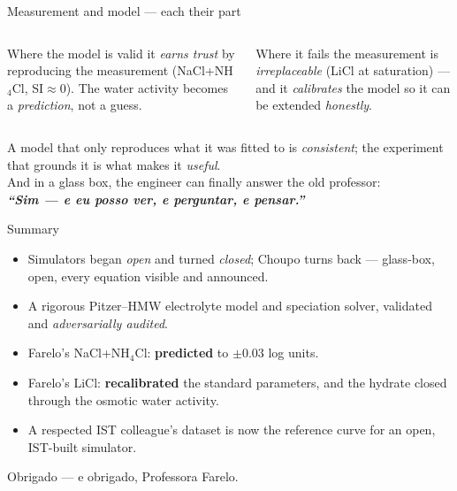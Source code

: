 \documentclass[aspectratio=169,11pt]{beamer}
\begin{document}
\begin{frame}{Measurement and model --- each their part}
\begin{columns}
\begin{block}{Where the model is valid}
it \emph{earns trust} by reproducing the measurement (NaCl+NH$_4$Cl, SI$\approx 0$).
The water activity becomes a \emph{prediction}, not a guess.
\end{block}
\begin{block}{Where it fails}
the measurement is \emph{irreplaceable} (LiCl at saturation) --- and it
\emph{calibrates} the model so it can be extended \emph{honestly}.
\end{block}
\end{columns}
\vspace{0.8em}
\centering
A model that only reproduces what it was fitted to is \emph{consistent}; the
experiment that grounds it is what makes it \emph{useful}.\\[0.6em]
And in a glass box, the engineer can finally answer the old professor:\\[0.3em]
\textbf{\itshape ``Sim --- e eu posso ver, e perguntar, e pensar.''}
\end{frame}

\begin{frame}{Summary}
\begin{itemize}
  \item Simulators began \emph{open} and turned \emph{closed}; Choupo turns back
        --- glass-box, open, every equation visible and announced.
  \item A rigorous Pitzer--HMW electrolyte model and speciation solver, validated
        and \emph{adversarially audited}.
  \item Farelo's NaCl+NH$_4$Cl: \textbf{predicted} to $\pm0.03$ log units.
  \item Farelo's LiCl: \textbf{recalibrated} the standard parameters, and the
        hydrate closed through the osmotic water activity.
  \item A respected IST colleague's dataset is now the reference curve for an
        open, IST-built simulator.
\end{itemize}
\vspace{0.8em}
\centering\large Obrigado --- e obrigado, Professora Farelo.
\end{frame}
\end{document}
